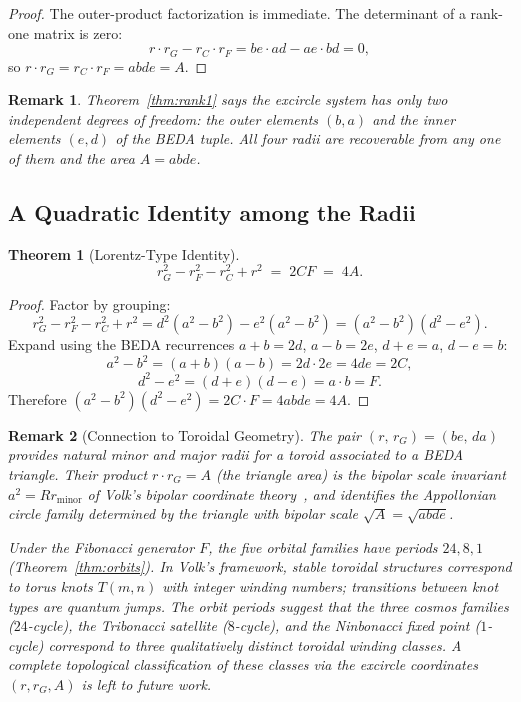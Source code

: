\documentclass[12pt]{article}
\newtheorem{theorem}{Theorem}
\newtheorem{remark}{Remark}
\begin{document}
\begin{proof}
The outer-product factorization is immediate.  The determinant of a rank-one matrix
is zero:
\[
  r\cdot r_G - r_C\cdot r_F = be\cdot ad - ae\cdot bd = 0,
\]
so $r\cdot r_G = r_C\cdot r_F = abde = A$.
\end{proof}

\begin{remark}
Theorem~\ref{thm:rank1} says the excircle system has only two independent degrees of
freedom: the outer elements $(b,a)$ and the inner elements $(e,d)$ of the BEDA tuple.
All four radii are recoverable from any one of them and the area $A = abde$.
\end{remark}

\subsection{A Quadratic Identity among the Radii}

\begin{theorem}[Lorentz-Type Identity]\label{thm:lorentz}
\[
  r_G^2 - r_F^2 - r_C^2 + r^2 \;=\; 2CF \;=\; 4A.
\]
\end{theorem}

\begin{proof}
Factor by grouping:
\[
  r_G^2-r_F^2-r_C^2+r^2
  = d^2(a^2-b^2) - e^2(a^2-b^2)
  = (a^2-b^2)(d^2-e^2).
\]
Expand using the BEDA recurrences $a+b=2d$, $a-b=2e$, $d+e=a$, $d-e=b$:
\[
  a^2-b^2 = (a+b)(a-b) = 2d\cdot 2e = 4de = 2C,
\]
\[
  d^2-e^2 = (d+e)(d-e) = a\cdot b = F.
\]
Therefore $(a^2-b^2)(d^2-e^2) = 2C\cdot F = 4abde = 4A$.
\end{proof}

\begin{remark}[Connection to Toroidal Geometry]
The pair $(r,\, r_G) = (be,\, da)$ provides natural minor and major radii for a
toroid associated to a BEDA triangle.  Their product $r\cdot r_G = A$ (the triangle
area) is the bipolar scale invariant $a^2 = Rr_{\mathrm{minor}}$ of Volk's bipolar
coordinate theory~\cite{volk}, and identifies the Appollonian circle family
determined by the triangle with bipolar scale $\sqrt{A} = \sqrt{abde}$.

Under the Fibonacci generator $F$, the five orbital families have periods $24, 8, 1$
(Theorem~\ref{thm:orbits}).  In Volk's framework, stable toroidal structures
correspond to torus knots $T(m,n)$ with integer winding numbers; transitions between
knot types are quantum jumps.  The orbit periods suggest that the three cosmos
families ($24$-cycle), the Tribonacci satellite ($8$-cycle), and the Ninbonacci fixed
point ($1$-cycle) correspond to three qualitatively distinct toroidal winding classes.
A complete topological classification of these classes via the excircle coordinates
$(r, r_G, A)$ is left to future work.
\end{remark}
\end{document}
